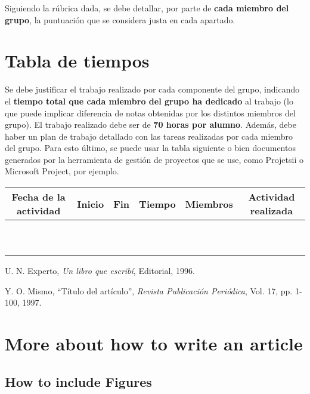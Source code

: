 \documentclass[a4paper]{article}
\begin{document}
Siguiendo la rúbrica dada, se debe detallar, por parte de  \textbf{cada miembro del grupo}, la puntuación que se considera justa en cada apartado. 

\section{Tabla de tiempos}


Se debe justificar el trabajo realizado por cada componente del grupo, indicando el {\bf tiempo total que cada miembro del grupo ha dedicado} al trabajo (lo que puede implicar diferencia de notas obtenidas por los distintos miembros del grupo). El trabajo realizado debe ser de {\bf 70 horas por alumno}. Además, debe haber un plan de trabajo detallado con las tareas realizadas por cada miembro del grupo. Para esto último, se puede usar la tabla siguiente o bien documentos generados por la herramienta de gestión de proyectos que se use, como Projetsii o Microsoft Project, por ejemplo.

\begin{center}
\begin{tabular}{|c|c|c|c|c|c|}
\hline
 Fecha de la
 actividad 
&  Inicio 
&  Fin 
& Tiempo
& Miembros
& Actividad realizada
\\\hline
\mbox{ }&\mbox{}&\mbox{ }&\mbox{}&\mbox{ }&\mbox{}\\
\mbox{ }&\mbox{}&\mbox{ }&\mbox{}&\mbox{ }&\mbox{}\\\hline
\end{tabular}
\end{center}


\begin{thebibliography}{10}



U. N. Experto, \emph{Un libro que escribí},
Editorial, 1996.

Y. O. Mismo,
``Título del artículo'',
\emph{Revista Publicación Periódica}, Vol. 17, pp. 1-100, 1997.
\end{thebibliography}

\newpage 

\section*{More about how to write an article}
\subsection{How to include Figures}
\end{document}
